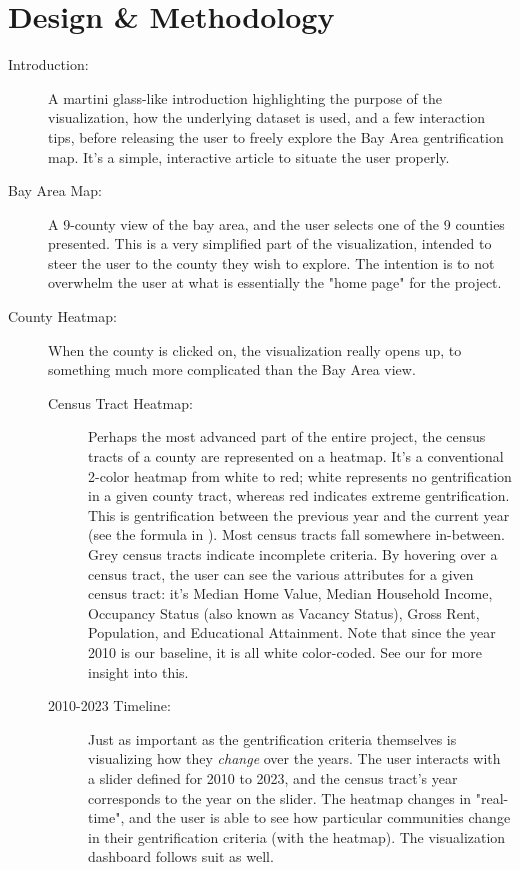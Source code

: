\documentclass{article}
\begin{document}
\section{Design \& Methodology} \label{design}
   
\begin{description}

    \item[Introduction:] A martini glass-like introduction highlighting the purpose of the visualization, how the underlying dataset is used, and a few interaction tips, before releasing the user to freely explore the Bay Area gentrification map. It's a simple, interactive article to situate the user properly.
    
    \item[Bay Area Map:] A 9-county view of the bay area, and the user selects one of the 9 counties presented. This is a very simplified part of the visualization, intended to steer the user to the county they wish to explore. The intention is to not overwhelm the user at what is essentially the "home page" for the project.
    
    \item[County Heatmap:] When the county is clicked on, the visualization really opens up, to something much more complicated than the Bay Area view.
    
    \begin{description}
    
        \item[Census Tract Heatmap:] Perhaps the most advanced part of the entire project, the census tracts of a county are represented on a heatmap. It's a conventional 2-color heatmap from white to red; white represents no gentrification in a given county tract, whereas red indicates extreme gentrification. This is gentrification between the previous year and the current year (see the formula in ). Most census tracts fall somewhere in-between. Grey census tracts indicate incomplete criteria. By hovering over a census tract, the user can see the various attributes for a given census tract: it's Median Home Value, Median Household Income, Occupancy Status (also known as Vacancy Status), Gross Rent, Population, and Educational Attainment. Note that since the year 2010 is our baseline, it is all white color-coded. See our  for more insight into this.
        
        \item[2010-2023 Timeline:] Just as important as the gentrification criteria themselves is visualizing how they \textit{change} over the years. The user interacts with a slider defined for 2010 to 2023, and the census tract's year corresponds to the year on the slider. The heatmap changes in "real-time", and the user is able to see how particular communities change in their gentrification criteria (with the heatmap). The visualization dashboard follows suit as well.
        

\end{description}
\end{description}
\end{document}
